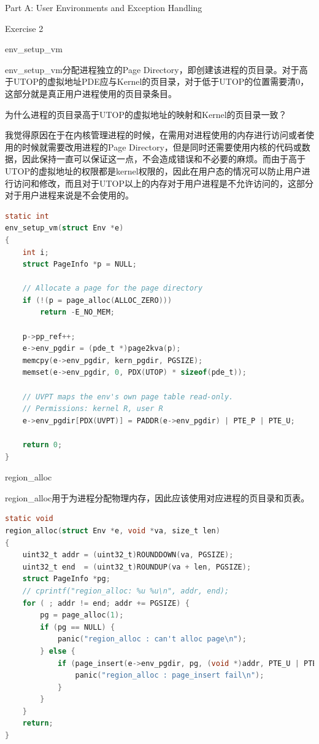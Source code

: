 \documentclass[GBK,winfonts,a4paper,10pt]{ctexart}
\begin{document}
\begin{section}{ Part A: User Environments and Exception Handling }
\begin{subsection}{ Exercise 2 }
\begin{subsubsection}{env\_setup\_vm}
\par
env\_setup\_vm分配进程独立的Page Directory，即创建该进程的页目录。对于高于UTOP的虚拟地址PDE应与Kernel的页目录，对于低于UTOP的位置需要清0，这部分就是真正用户进程使用的页目录条目。
\par
为什么进程的页目录高于UTOP的虚拟地址的映射和Kernel的页目录一致？
\par
我觉得原因在于在内核管理进程的时候，在需用对进程使用的内存进行访问或者使用的时候就需要改用进程的Page Directory，但是同时还需要使用内核的代码或数据，因此保持一直可以保证这一点，不会造成错误和不必要的麻烦。而由于高于UTOP的虚拟地址的权限都是kernel权限的，因此在用户态的情况可以防止用户进行访问和修改，而且对于UTOP以上的内存对于用户进程是不允许访问的，这部分对于用户进程来说是不会使用的。
\begin{lstlisting}[language=C]
static int
env_setup_vm(struct Env *e)
{
	int i;
	struct PageInfo *p = NULL;

	// Allocate a page for the page directory
	if (!(p = page_alloc(ALLOC_ZERO)))
		return -E_NO_MEM;

    p->pp_ref++;
    e->env_pgdir = (pde_t *)page2kva(p);
    memcpy(e->env_pgdir, kern_pgdir, PGSIZE);
    memset(e->env_pgdir, 0, PDX(UTOP) * sizeof(pde_t));

	// UVPT maps the env's own page table read-only.
	// Permissions: kernel R, user R
	e->env_pgdir[PDX(UVPT)] = PADDR(e->env_pgdir) | PTE_P | PTE_U;

	return 0;
}
\end{lstlisting}
\end{subsubsection}

\begin{subsubsection}{region\_alloc}
\par
region\_alloc用于为进程分配物理内存，因此应该使用对应进程的页目录和页表。
\begin{lstlisting}[language=C]
static void
region_alloc(struct Env *e, void *va, size_t len)
{
    uint32_t addr = (uint32_t)ROUNDDOWN(va, PGSIZE);
    uint32_t end  = (uint32_t)ROUNDUP(va + len, PGSIZE);
    struct PageInfo *pg;
    // cprintf("region_alloc: %u %u\n", addr, end);
    for ( ; addr != end; addr += PGSIZE) {
        pg = page_alloc(1);
        if (pg == NULL) {
            panic("region_alloc : can't alloc page\n");
        } else {
            if (page_insert(e->env_pgdir, pg, (void *)addr, PTE_U | PTE_W) != 0) {
                panic("region_alloc : page_insert fail\n");
            }
        }
    }
    return;
}
\end{lstlisting}
\end{subsubsection}



\end{subsection}
\end{section}
\end{document}
